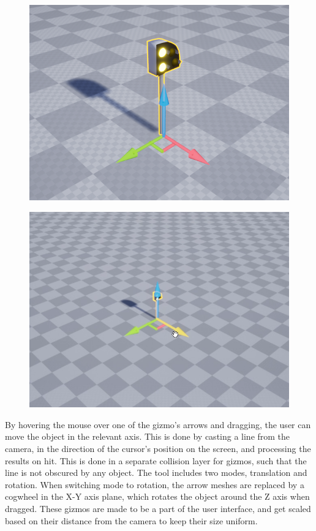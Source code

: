 \begin{figure}[h]
\centering
\begin{minipage}{.5\textwidth}
  \centering
  \includegraphics[width=0.95\linewidth]{figures/Gizmo1.png}
  \label{fig:test1}
\end{minipage}%
\begin{minipage}{.5\textwidth}
  \centering
  \includegraphics[width=0.95\linewidth]{figures/Gizmo2.png}
  \label{fig:test2}
\end{minipage}
\end{figure}

By hovering the mouse over one of the gizmo's arrows and dragging, the user can move the object in the relevant axis. This is done by casting a line from the camera, in the direction of the cursor's position on the screen, and processing the results on hit. This is done in a separate collision layer for gizmos, such that the line is not obscured by any object. The tool includes two modes, translation and rotation. When switching mode to rotation, the arrow meshes are replaced by a cogwheel in the X-Y axis plane, which rotates the object around the Z axis when dragged. These gizmos are made to be a part of the user interface, and get scaled based on their distance from the camera to keep their size uniform. 

